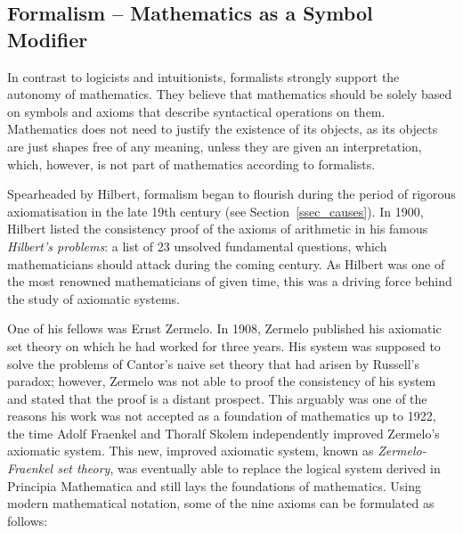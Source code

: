 \documentclass{article}
\begin{document}
\subsection{Formalism -- Mathematics as a Symbol Modifier}\label{ssec_formalism}
In contrast to logicists and intuitionists, formalists strongly support the autonomy of mathematics. 
They believe that mathematics should be solely based on symbols and axioms that describe syntactical operations on them. Mathematics does not need to justify the existence of its objects, as its objects are just shapes free of any meaning, unless they are given an interpretation, which, however, is not part of mathematics according to formalists.

Spearheaded by Hilbert, formalism began to flourish during the period of rigorous axiomatisation in the late 19th century (see Section~\ref{ssec_causes}). 
In 1900, Hilbert listed the consistency proof of the axioms of arithmetic in his famous \textit{Hilbert's problems}: a list of 23 unsolved fundamental questions, which mathematicians should attack during the coming century. As Hilbert was one of the most renowned mathematicians of given time, this was a driving force behind the study of axiomatic systems.

One of his fellows was Ernst Zermelo. In 1908, Zermelo published his axiomatic set theory on which he had worked for three years. His system was supposed to solve the problems of Cantor's naive set theory that had arisen by Russell's paradox; however, Zermelo was not able to proof the consistency of his system and stated that the proof is a distant prospect. This arguably was one of the reasons his work was not accepted as a foundation of mathematics up to 1922, the time Adolf Fraenkel and Thoralf Skolem independently improved Zermelo's axiomatic system.
This new, improved axiomatic system, known as \textit{Zermelo-Fraenkel set theory}, was eventually able to replace the logical system derived in Principia Mathematica and still lays the foundations of mathematics. Using modern mathematical notation, some of the nine axioms can be formulated as follows:
\end{document}
